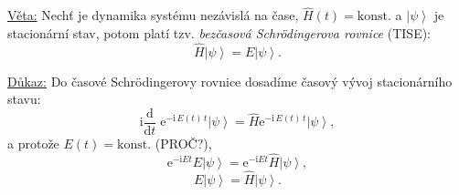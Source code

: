 \documentclass[10pt,a4paper]{article}
\theoremstyle{definition}
\newcommand{\const}[1]{\mathrm{#1}}
\newcommand{\dd}[2]{\frac{\const{d} #1}{\const{d} #2} \;}
\newcommand{\ket}[1]{\left| #1 \right>}
\newcommand{\e}[1]{\const{e}^{#1}}
\renewcommand{\i}{\const{i}}
\def\konst{\mathrm{konst.}}
\begin{document}
\vspace{2em}
\underline{Věta:}
Nechť je dynamika systému nezávislá na čase, $\hat{H}(t) = \konst$ a $\ket{\psi}$ je stacionární stav, potom platí tzv. \textit{bezčasová Schrödingerova rovnice} (TISE): $$\hat{H} \ket{\psi} = E \ket{\psi}.$$

\underline{Důkaz:}
Do časové Schrödingerovy rovnice dosadíme časový vývoj stacionárního stavu: $$\i \dd{}{t} \e{-\i \, E(t) \, t} \ket{\psi} = \hat{H} \e{-\i \, E(t) \, t} \ket{\psi},$$ a protože $E(t) = \konst$ (PROČ?), $$\e{-\i E t} E \ket{\psi} = \e{-\i E t} \hat{H} \ket{\psi},$$ $$E \ket{\psi} = \hat{H} \ket{\psi}.$$
\end{document}
